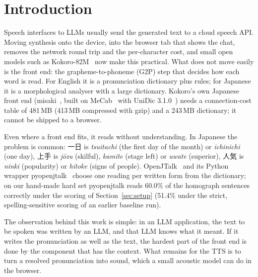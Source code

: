 \documentclass[11pt,a4paper]{article}
\begin{document}
\section{Introduction}

Speech interfaces to LLMs usually send the generated text to a cloud speech API. Moving synthesis onto the device,
into the browser tab that shows the chat, removes the network round trip and the per-character cost, and small
open models such as Kokoro-82M~\citep{kokoro82m} now make this practical. What does not move easily is the front end:
the grapheme-to-phoneme (G2P) step that decides how each word is read. For English it is a pronunciation dictionary
plus rules; for Japanese it is a morphological analyser with a large dictionary. Kokoro's own Japanese front end
(misaki~\citep{misaki}, built on MeCab~\citep{kudo2004mecab} with UniDic 3.1.0~\citep{den2008unidic}) needs a
connection-cost table of 481\,MB (413\,MB compressed with gzip) and a 243\,MB dictionary; it cannot be shipped to a
browser.

Even where a front end fits, it reads without understanding. In Japanese the problem is common: 一日 is
\emph{tsuitachi} (the first day of the month) or \emph{ichinichi} (one day), 上手 is \emph{jōzu} (skilful),
\emph{kamite} (stage left) or \emph{uwate} (superior), 人気 is \emph{ninki} (popularity) or \emph{hitoke} (signs of
people). OpenJTalk~\citep{openjtalk} and its Python wrapper pyopenjtalk~\citep{pyopenjtalk} choose one reading per
written form from the dictionary; on our hand-made hard set pyopenjtalk reads 60.0\% of the homograph sentences correctly
under the scoring of Section~\ref{sec:setup} (51.4\% under the strict, spelling-sensitive scoring of an earlier baseline run).

The observation behind this work is simple: in an LLM application, the text to be spoken was written by an LLM, and
that LLM knows what it meant. If it writes the pronunciation as well as the text, the hardest part of the front end
is done by the component that has the context. What remains for the TTS is to turn a resolved pronunciation into
sound, which a small acoustic model can do in the browser.
\end{document}
